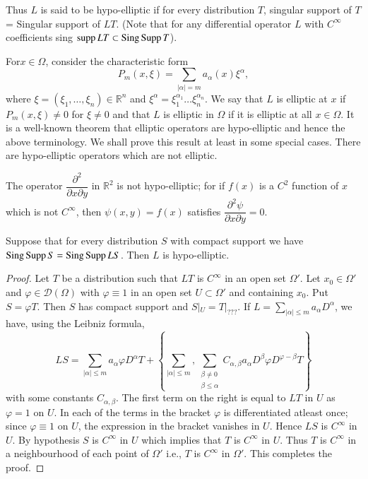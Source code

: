 Thus $L$ is said to be hypo-elliptic if for every distribution $T$, singular support of $T$ = Singular support of $LT$. (Note that for any differential operator $L$ with $C^{\infty}$ coefficients sing $\operatorname{supp} LT \subset \operatorname{Sing} \operatorname{Supp} T$).

\begin{remark*}
For\pageoriginale $x\in \Omega$, consider the characteristic form 
$$
P_{m}(x,\xi)=\sum\limits_{|\alpha|=m}a_{\alpha}(x)\xi^{\alpha},
$$ 
where $\xi=(\xi_{1},\ldots,\xi_{n})\in \mathbb{R}^{n}$ and $\xi^{\alpha}=\xi^{\alpha_{1}}_{1}\ldots \xi^{\alpha_{n}}_{n}$. We say that $L$ is elliptic at $x$ if $P_{m}(x,\xi)\neq 0$ for $\xi\neq 0$ and that $L$ is elliptic in $\Omega$ if it is elliptic at all $x\in \Omega$. It is a well-known theorem that elliptic operators are hypo-elliptic and hence the above terminology. We shall prove this result at least in some special cases. There are hypo-elliptic operators which are not elliptic.
\end{remark*}

The operator $\dfrac{\partial^{2}}{\partial x\partial y}$ in $\mathbb{R}^{2}$ is not hypo-elliptic; for if $f(x)$ is a $C^{2}$ function of $x$ which is not $C^{\infty}$, then $\psi(x,y)=f(x)$ satisfies $\dfrac{\partial^{2}\psi}{\partial x\partial y}=0$. 

\begin{proposition}\label{chap3-prop5}
Suppose that for every distribution $S$ with compact support we have $\operatorname{Sing} \operatorname{Supp} S=\operatorname{Sing} \operatorname{Supp} LS$. Then $L$ is hypo-elliptic.
\end{proposition}

\begin{proof}
Let $T$ be a distribution such that $LT$ is $C^{\infty}$ in an open set $\Omega'$. Let $x_{0}\in \Omega'$ and $\varphi\in \mathcal{D}(\Omega)$ with $\varphi\equiv 1$ in an open set $U\subset \Omega'$ and containing $x_{0}$. Put $S=\varphi T$. Then $S$ has compact support and $S|_{U}=T|_{???}$. If $L=\sum\limits_{|\alpha|\leq m}a_{\alpha}D^{\alpha}$, we have, using the Leibniz formula,
$$
LS=\sum\limits_{|\alpha|\leq m}a_{\alpha}\varphi D^{\alpha}T+\left\{\sum\limits_{|\alpha|\leq m}, \sum\limits_{\substack{\beta\neq 0\\ \beta\leq \alpha}}C_{\alpha,\beta}a_{\alpha}D^{\beta}\varphi D^{\varphi-\beta}T\right\}
$$
with some constants $C_{\alpha,\beta}$. The first term on the right is equal to $LT$ in $U$ as $\varphi=1$ on $U$. In each of the terms in the bracket $\varphi$ is differentiated atleast once; since $\varphi\equiv 1$ on $U$, the expression in the bracket vanishes in $U$. Hence $LS$ is $C^{\infty}$ in $U$. By hypothesis $S$ is $C^{\infty}$ in $U$ which implies that $T$ is $C^{\infty}$ in $U$. Thus $T$ is $C^{\infty}$ in a neighbourhood of each point of $\Omega'$ i.e., $T$ is $C^{\infty}$ in $\Omega'$. This completes the proof.
\end{proof}

